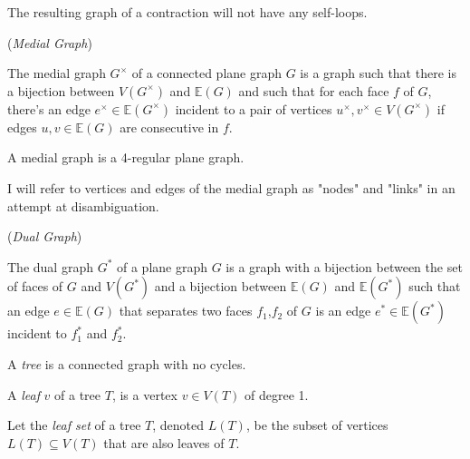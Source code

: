 \documentclass{article}
\begin{document}
	\begin{corollary}
		The resulting graph of a contraction will not have any self-loops.
	\end{corollary}

	\begin{center}
		
	\end{center}
	
	\begin{definition}\label{def:medial}
		(\textit{Medial Graph})
		
		The medial graph $G^\times$ of a connected plane graph $G$ is a graph such that there is a bijection between $V(G^\times)$ and $\mathbb{E}(G)$ and such that for each face $f$ of $G$, there's an edge $e^\times \in \mathbb{E}(G^\times)$ incident to a pair of vertices $u^\times,v^\times \in V(G^\times)$ if edges $u,v \in \mathbb{E}(G)$ are consecutive in $f$.
	\end{definition}

	\begin{center}
		
	\end{center}
	
	\begin{corollary}
		A medial graph is a 4-regular plane graph.
	\end{corollary}

	I will refer to vertices and edges of the medial graph as "nodes" and "links" in an attempt at disambiguation.

	\begin{definition}
		(\textit{Dual Graph})

		The dual graph $G^*$ of a plane graph $G$ is a graph with a bijection between the set of faces of $G$ and $V(G^*)$ and a bijection between $\mathbb{E}(G)$ and $\mathbb{E}(G^*)$ such that an edge $e \in \mathbb{E}(G)$ that separates two faces $f_1$,$f_2$ of $G$ is an edge $e^* \in \mathbb{E}(G^*)$ incident to $f_1^*$ and $f_2^*$.
	\end{definition}

	\begin{center}
		
	\end{center}

	A \textit{tree} is a connected graph with no cycles.

	A \textit{leaf} $v$ of a tree $T$, is a vertex $v \in V(T)$ of degree 1.

	Let the \textit{leaf set} of a tree $T$, denoted $L(T)$, be the subset of vertices $L(T) \subseteq V(T)$ that are also leaves of $T$.
	
\end{document}
